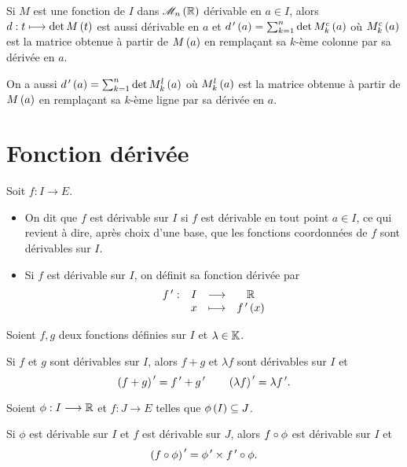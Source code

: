 \begin{ex}
Si \(M\) est une fonction de \(I\) dans \(\M{n}[\R]\) dérivable en \(a\in I\), alors \(d:t\longmapsto\det M\left(t\right)\) est aussi dérivable en \(a\) et \(d^{\,\prime}\left(a\right)=\sum_{k=1}^n\det M_k^c\left(a\right)\) où \(M_k^c\left(a\right)\) est la matrice obtenue à partir de \(M\left(a\right)\) en remplaçant sa \(k\)-ème colonne par sa dérivée en \(a\).

On a aussi \(d^{\,\prime}\left(a\right)=\sum_{k=1}^n\det M_k^l\left(a\right)\) où \(M_k^l\left(a\right)\) est la matrice obtenue à partir de \(M\left(a\right)\) en remplaçant sa \(k\)-ème ligne par sa dérivée en \(a\).
\end{ex}

\section{Fonction dérivée}

\begin{defi}
Soit \(f:I\to E\).

\begin{itemize}
    \item On dit que \(f\) est dérivable sur \(I\) si \(f\) est dérivable en tout point \(a\in I\), ce qui revient à dire, après choix d'une base, que les fonctions coordonnées de \(f\) sont dérivables sur \(I\). \\
    \item Si \(f\) est dérivable sur \(I\), on définit sa fonction dérivée par \[\begin{array}[t]{cccc}f^{\,\prime} : & I & \longrightarrow & \mathbb{R} \\ & x & \longmapsto & f^{\,\prime}\left(x\right)\end{array}\]
\end{itemize}
\end{defi}

\begin{prop}
Soient \(f,g\) deux fonctions définies sur \(I\) et \(\lambda\in\mathbb{K}\).

Si \(f\) et \(g\) sont dérivables sur \(I\), alors \(f+g\) et \(\lambda f\) sont dérivables sur \(I\) et \[\left(f+g\right)^{\,\prime}=f^{\,\prime}+g^{\,\prime}\qquad\left(\lambda f\right)^{\,\prime}=\lambda f^{\,\prime}.\]
\end{prop}

\begin{prop}
Soient \(\phi:I\longrightarrow\mathbb{R}\) et \(f:J\to E\) telles que \(\phi\left(I\right)\subseteq J\).

Si \(\phi\) est dérivable sur \(I\) et \(f\) est dérivable sur \(J\), alors \(f\circ\phi\) est dérivable sur \(I\) et \[\left(f\circ\phi\right)^{\,\prime}=\phi^{\,\prime}\times f^{\,\prime}\circ\phi.\]
\end{prop}

